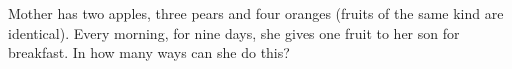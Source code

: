 Mother has two apples, three pears and four oranges (fruits of the same kind are identical). Every morning, for nine days, she gives one fruit to her son for breakfast. In how many ways can she do this?
